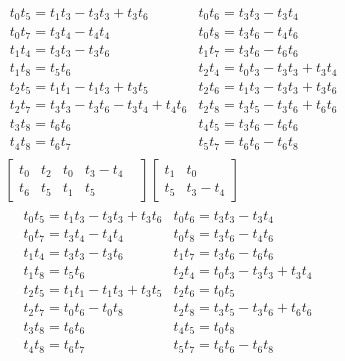 



\begin{align*}
    &\begin{array}{ll}
        t_{0}t_{5} = t_{1}t_{3} - t_{3}t_{3} + t_{3}t_{6}&
        t_{0}t_{6} = t_{3}t_{3} - t_{3}t_{4}\\
        t_{0}t_{7} = t_{3}t_{4} - t_{4}t_{4}&
        t_{0}t_{8} = t_{3}t_{6} - t_{4}t_{6}\\
        t_{1}t_{4} = t_{3}t_{3} - t_{3}t_{6}&
        t_{1}t_{7} = t_{3}t_{6} - t_{6}t_{6}\\
        t_{1}t_{8} = t_{5}t_{6}&
        t_{2}t_{4} = t_{0}t_{3} - t_{3}t_{3} + t_{3}t_{4}\\
        t_{2}t_{5} = t_{1}t_{1} - t_{1}t_{3} + t_{3}t_{5}&
        t_{2}t_{6} = t_{1}t_{3} - t_{3}t_{3} + t_{3}t_{6}\\
        t_{2}t_{7} = t_{3}t_{3} - t_{3}t_{6} - t_{3}t_{4} + t_{4}t_{6}&
        t_{2}t_{8} = t_{3}t_{5} - t_{3}t_{6} + t_{6}t_{6}\\
        t_{3}t_{8} = t_{6}t_{6}&
        t_{4}t_{5} = t_{3}t_{6} - t_{6}t_{6}\\
        t_{4}t_{8} = t_{6}t_{7}&
        t_{5}t_{7} = t_{6}t_{6} - t_{6}t_{8}
    \end{array}\\
    &\left[\begin{array}{cccccc}
        t_0 & t_2 & t_0   &   t_3 - t_4       &  \\
        t_6 & t_5 & t_1   &   t_5
    \end{array}\right]
    \left[\begin{array}{cc}
        t_1 & t_0 \\
        t_5 & t_3-t_4
    \end{array}\right]
\end{align*}
\begin{align*}
    \begin{array}{ll}
        t_{0}t_{5} = t_{1}t_{3} - t_{3}t_{3} + t_{3}t_{6}&
        t_{0}t_{6} = t_{3}t_{3} - t_{3}t_{4}\\
        t_{0}t_{7} = t_{3}t_{4} - t_{4}t_{4}&
        t_{0}t_{8} = t_{3}t_{6} - t_{4}t_{6}\\
        t_{1}t_{4} = t_{3}t_{3} - t_{3}t_{6}&
        t_{1}t_{7} = t_{3}t_{6} - t_{6}t_{6}\\
        t_{1}t_{8} = t_{5}t_{6}&
        t_{2}t_{4} = t_{0}t_{3} - t_{3}t_{3} + t_{3}t_{4}\\
        t_{2}t_{5} = t_{1}t_{1} - t_{1}t_{3} + t_{3}t_{5}&
        t_{2}t_{6} = t_{0}t_{5}\\
        t_{2}t_{7} = t_{0}t_{6} - t_{0}t_{8}&
        t_{2}t_{8} = t_{3}t_{5} - t_{3}t_{6} + t_{6}t_{6}\\
        t_{3}t_{8} = t_{6}t_{6}&
        t_{4}t_{5} = t_{0}t_{8}\\
        t_{4}t_{8} = t_{6}t_{7}&
        t_{5}t_{7} = t_{6}t_{6} - t_{6}t_{8}
    \end{array}
\end{align*}
